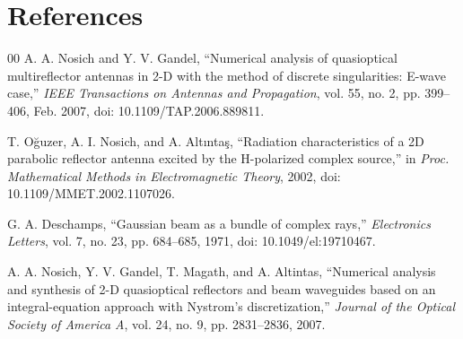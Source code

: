 \documentclass[conference]{IEEEtran}
\begin{document}
\section*{References}
\begin{thebibliography}{00}
A. A. Nosich and Y. V. Gandel, ``Numerical analysis of quasioptical multireflector antennas in 2-D with the method of discrete singularities: E-wave case,'' \emph{IEEE Transactions on Antennas and Propagation}, vol. 55, no. 2, pp. 399--406, Feb. 2007, doi: 10.1109/TAP.2006.889811.

T. O\u{g}uzer, A. I. Nosich, and A. Alt\i nta\c{s}, ``Radiation characteristics of a 2D parabolic reflector antenna excited by the H-polarized complex source,'' in \emph{Proc. Mathematical Methods in Electromagnetic Theory}, 2002, doi: 10.1109/MMET.2002.1107026.

G. A. Deschamps, ``Gaussian beam as a bundle of complex rays,'' \emph{Electronics Letters}, vol. 7, no. 23, pp. 684--685, 1971, doi: 10.1049/el:19710467.

A. A. Nosich, Y. V. Gandel, T. Magath, and A. Altintas, ``Numerical analysis and synthesis of 2-D quasioptical reflectors and beam waveguides based on an integral-equation approach with Nystrom's discretization,'' \emph{Journal of the Optical Society of America A}, vol. 24, no. 9, pp. 2831--2836, 2007.
\end{thebibliography}
\end{document}
